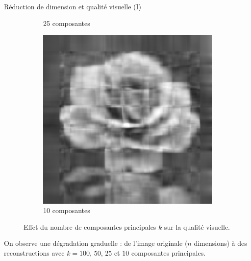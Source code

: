 \documentclass{beamer}
\begin{document}
\begin{frame}{Réduction de dimension et qualité visuelle (I)}
\begin{figure}
\begin{subfigure}{0.18\textwidth}
    \caption*{25 composantes}
  \end{subfigure}\hfill
  \begin{subfigure}{0.18\textwidth}
    \includegraphics[width=\linewidth]{images/pca_10.png}
    \caption*{10 composantes}
  \end{subfigure}
  \caption{Effet du nombre de composantes principales $k$ sur la qualité visuelle.}
\end{figure}

On observe une dégradation graduelle : de l’image originale ($n$ dimensions) à des reconstructions avec $k=100$, $50$, $25$ et $10$ composantes principales.
\end{frame}
\end{document}
